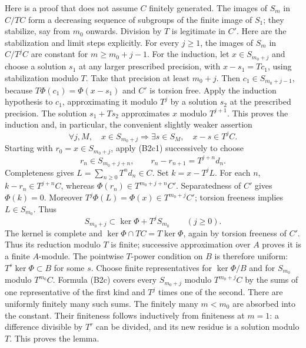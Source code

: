 Here is a proof that does not assume \(C\) finitely generated.
The images of \(S_m\) in \(C/TC\) form a decreasing sequence of
subgroups of the finite image of \(S_1\); they stabilize, say from
\(m_0\) onwards.
Division by \(T\) is legitimate in \(C'\).
Here are the stabilization and limit steps explicitly.
For every \(j\geq1\), the images of \(S_m\) in \(C/T^jC\)
are constant for \(m\geq m_0+j-1\).
For the induction, let \(x\in S_{m_0+j}\) and choose a solution
\(s_1\) at any larger prescribed precision, with
\(x-s_1=T c_1\), using stabilization modulo \(T\).
Take that precision at least \(m_0+j\).
Then \(c_1\in S_{m_0+j-1}\), because
\(T\Phi(c_1)=\Phi(x-s_1)\) and \(C'\) is torsion free.
Apply the induction hypothesis to \(c_1\), approximating it
modulo \(T^j\) by a solution \(s_2\) at the prescribed precision.
The solution \(s_1+Ts_2\) approximates \(x\) modulo \(T^{j+1}\).
This proves the induction and, in particular, the convenient
slightly weaker assertion
\[
 \forall j,M,\quad
 x\in S_{m_0+j}\Longrightarrow
 \exists s\in S_M,\quad x-s\in T^jC.
 \tag{B2c1}
\]
Starting with \(r_0=x\in S_{m_0+j}\), apply (B2c1) successively
to choose
\[
 r_n\in S_{m_0+j+n},\qquad
 r_n-r_{n+1}=T^{j+n}d_n .
\]
Completeness gives \(L=\sum_{n\geq0}T^nd_n\in C\).
Set \(k=x-T^jL\).
For each \(n\), \(k-r_n\in T^{j+n}C\), whereas
\(\Phi(r_n)\in T^{m_0+j+n}C'\).
Separatedness of \(C'\) gives \(\Phi(k)=0\).
Moreover \(T^j\Phi(L)=\Phi(x)\in T^{m_0+j}C'\);
torsion freeness implies \(L\in S_{m_0}\).
Thus
\[
 S_{m_0+j}\subset\ker\Phi+T^jS_{m_0}\qquad(j\geq0).
 \tag{B2c}
\]
The kernel is complete and
\(\ker\Phi\cap TC=T\ker\Phi\), again by torsion freeness of \(C'\).
Thus its reduction modulo \(T\) is finite; successive approximation
over \(A\) proves it is a finite \(A\)-module.
The pointwise \(T\)-power condition on \(B\) is therefore uniform:
\(T^s\ker\Phi\subset B\) for some \(s\).
Choose finite representatives for \(\ker\Phi/B\) and for
\(S_{m_0}\) modulo \(T^{m_0}C\).
Formula (B2c) covers every \(S_{m_0+j}\) modulo \(T^{m_0+j}C\) by
the sums of one representative of the first kind and \(T^j\)
times one of the second.
There are uniformly finitely many such sums.
The finitely many \(m<m_0\) are absorbed into the constant.
Their finiteness follows inductively from finiteness at \(m=1\):
a difference divisible by \(T^r\) can be divided, and its new
residue is a solution modulo \(T\).
This proves the lemma.

